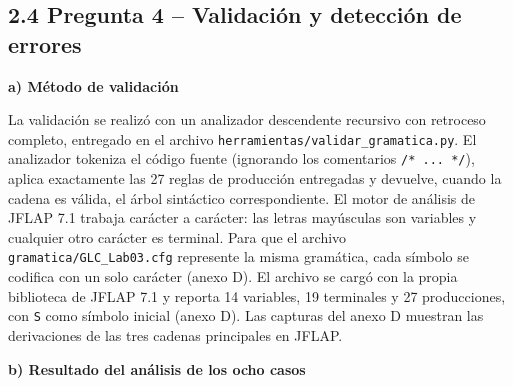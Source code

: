 \documentclass[11pt,letterpaper]{article}
\newcommand{\apartado}[1]{\par\Needspace{4\baselineskip}\medskip\noindent\textbf{#1}\par\nobreak\smallskip}
\begin{document}
\subsection*{2.4 Pregunta 4 -- Validación y detección de errores}

\apartado{a) Método de validación}

La validación se realizó con un analizador descendente recursivo con retroceso completo, entregado
en el archivo \texttt{herramientas/\allowbreak validar\_gramatica.py}. El analizador tokeniza el código fuente
(ignorando los comentarios \texttt{/* ... */}), aplica exactamente las 27 reglas de producción
entregadas y devuelve, cuando la cadena es válida, el árbol sintáctico correspondiente. El motor de
análisis de JFLAP 7.1 trabaja carácter a carácter: las letras mayúsculas son variables y cualquier
otro carácter es terminal. Para que el archivo \texttt{gramatica/\allowbreak GLC\_Lab03.cfg}
represente la misma gramática, cada símbolo se codifica con un solo carácter (anexo D). El
archivo se cargó con la propia biblioteca de JFLAP 7.1 y reporta 14 variables, 19 terminales y 27
producciones, con \texttt{S} como símbolo inicial (anexo D). Las capturas del anexo D muestran
las derivaciones de las tres cadenas principales en JFLAP.

\apartado{b) Resultado del análisis de los ocho casos}
\end{document}

